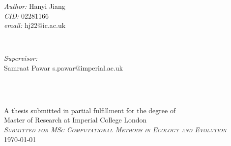 \begin{titlepage}
    \vspace{1cm}
    \begin{minipage}{0.5\textwidth}
    \begin{flushleft} \large
    \emph{Author:} Hanyi Jiang \\
    \emph{CID:} 02281166\\
    \emph{email:} hj22@ic.ac.uk
    \end{flushleft}
    \end{minipage}
    ~
    \begin{minipage}{0.4\textwidth}
    \begin{flushright} \large
    \emph{Supervisor:} \\
    Samraat Pawar
    s.pawar@imperial.ac.uk\\[1.2em]
    \end{flushright}
    \end{minipage}\\[2.5cm]
    \makeatother
    
    \vspace{3cm}
    \\
    
    
    {\large A thesis submitted in partial fulfillment for the degree of}\\[0.1cm]
    \large Master of Research at Imperial College London\\[0.1cm]
    \textsc{\large \emph{Submitted for MSc Computational Methods in Ecology and Evolution}}\\[0.2cm] %
    {\large \monthyeardate\today}\\ %
    
    
    \vfill %
	
\end{titlepage}